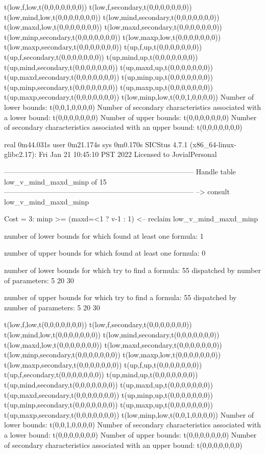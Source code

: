 t(low,f,low,t(0,0,0,0,0,0,0))
t(low,f,secondary,t(0,0,0,0,0,0,0))
t(low,mind,low,t(0,0,0,0,0,0,0))
t(low,mind,secondary,t(0,0,0,0,0,0,0))
t(low,maxd,low,t(0,0,0,0,0,0,0))
t(low,maxd,secondary,t(0,0,0,0,0,0,0))
t(low,minp,secondary,t(0,0,0,0,0,0,0))
t(low,maxp,low,t(0,0,0,0,0,0,0))
t(low,maxp,secondary,t(0,0,0,0,0,0,0))
t(up,f,up,t(0,0,0,0,0,0,0))
t(up,f,secondary,t(0,0,0,0,0,0,0))
t(up,mind,up,t(0,0,0,0,0,0,0))
t(up,mind,secondary,t(0,0,0,0,0,0,0))
t(up,maxd,up,t(0,0,0,0,0,0,0))
t(up,maxd,secondary,t(0,0,0,0,0,0,0))
t(up,minp,up,t(0,0,0,0,0,0,0))
t(up,minp,secondary,t(0,0,0,0,0,0,0))
t(up,maxp,up,t(0,0,0,0,0,0,0))
t(up,maxp,secondary,t(0,0,0,0,0,0,0))
t(low,minp,low,t(0,0,1,0,0,0,0))
Number of lower bounds:                                             t(0,0,1,0,0,0,0)
Number of secondary characteristics associated with a lower bound:  t(0,0,0,0,0,0,0)
Number of upper bounds:                                             t(0,0,0,0,0,0,0)
Number of secondary characteristics associated with an upper bound: t(0,0,0,0,0,0,0)

real	0m44.031s
user	0m21.174s
sys	0m0.170s
SICStus 4.7.1 (x86_64-linux-glibc2.17): Fri Jan 21 10:45:10 PST 2022
Licensed to JovialPersonal


--------------------------------------------------------------------------------
Handle table low_v_mind_maxd_minp of 15
--------------------------------------------------------------------------------
--> consult low_v_mind_maxd_minp

Cost =  3:  minp >= (maxd=<1 ? v-1 : 1)
<-- reclaim low_v_mind_maxd_minp

number of lower bounds for which found at least one formula: 1

number of upper bounds for which found at least one formula: 0

number of lower bounds for which try to find a formula: 55
dispatched by number of parameters: 5  20  30

number of upper bounds for which try to find a formula: 55
dispatched by number of parameters: 5  20  30

t(low,f,low,t(0,0,0,0,0,0,0))
t(low,f,secondary,t(0,0,0,0,0,0,0))
t(low,mind,low,t(0,0,0,0,0,0,0))
t(low,mind,secondary,t(0,0,0,0,0,0,0))
t(low,maxd,low,t(0,0,0,0,0,0,0))
t(low,maxd,secondary,t(0,0,0,0,0,0,0))
t(low,minp,secondary,t(0,0,0,0,0,0,0))
t(low,maxp,low,t(0,0,0,0,0,0,0))
t(low,maxp,secondary,t(0,0,0,0,0,0,0))
t(up,f,up,t(0,0,0,0,0,0,0))
t(up,f,secondary,t(0,0,0,0,0,0,0))
t(up,mind,up,t(0,0,0,0,0,0,0))
t(up,mind,secondary,t(0,0,0,0,0,0,0))
t(up,maxd,up,t(0,0,0,0,0,0,0))
t(up,maxd,secondary,t(0,0,0,0,0,0,0))
t(up,minp,up,t(0,0,0,0,0,0,0))
t(up,minp,secondary,t(0,0,0,0,0,0,0))
t(up,maxp,up,t(0,0,0,0,0,0,0))
t(up,maxp,secondary,t(0,0,0,0,0,0,0))
t(low,minp,low,t(0,0,1,0,0,0,0))
Number of lower bounds:                                             t(0,0,1,0,0,0,0)
Number of secondary characteristics associated with a lower bound:  t(0,0,0,0,0,0,0)
Number of upper bounds:                                             t(0,0,0,0,0,0,0)
Number of secondary characteristics associated with an upper bound: t(0,0,0,0,0,0,0)

